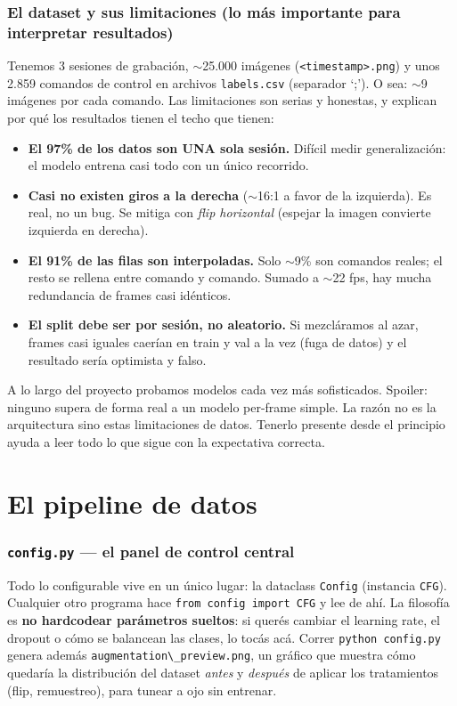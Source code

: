 \documentclass[11pt,a4paper]{article}
\newcommand{\code}[1]{\lstinline[basicstyle=\ttfamily\normalsize]|#1|}
\begin{document}
\section{El dataset y sus limitaciones (lo más importante para interpretar resultados)}
Tenemos 3 sesiones de grabación, $\sim$25.000 imágenes (\code{<timestamp>.png}) y unos 2.859 comandos de
control en archivos \code{labels.csv} (separador `;'). O sea: $\sim$9 imágenes por cada comando. Las
limitaciones son serias y honestas, y explican por qué los resultados tienen el techo que tienen:

\begin{itemize}
  \item \textbf{El 97\% de los datos son UNA sola sesión.} Difícil medir generalización: el modelo entrena
  casi todo con un único recorrido.
  \item \textbf{Casi no existen giros a la derecha} ($\sim$16:1 a favor de la izquierda). Es real, no un bug.
  Se mitiga con \emph{flip horizontal} (espejar la imagen convierte izquierda en derecha).
  \item \textbf{El 91\% de las filas son interpoladas.} Solo $\sim$9\% son comandos reales; el resto se
  rellena entre comando y comando. Sumado a $\sim$22 fps, hay mucha redundancia de frames casi idénticos.
  \item \textbf{El split debe ser por sesión, no aleatorio.} Si mezcláramos al azar, frames casi iguales
  caerían en train y val a la vez (fuga de datos) y el resultado sería optimista y falso.
\end{itemize}

\begin{ojo}
A lo largo del proyecto probamos modelos cada vez más sofisticados. Spoiler: ninguno supera de forma real
a un modelo per-frame simple. La razón no es la arquitectura sino estas limitaciones de datos. Tenerlo
presente desde el principio ayuda a leer todo lo que sigue con la expectativa correcta.
\end{ojo}

\part{El pipeline de datos}

\section{\texttt{config.py} --- el panel de control central}
Todo lo configurable vive en un único lugar: la dataclass \code{Config} (instancia \code{CFG}). Cualquier otro
programa hace \code{from config import CFG} y lee de ahí. La filosofía es \textbf{no hardcodear parámetros
sueltos}: si querés cambiar el learning rate, el dropout o cómo se balancean las clases, lo tocás acá.
Correr \code{python config.py} genera además \code{augmentation\_preview.png}, un gráfico que muestra cómo
quedaría la distribución del dataset \emph{antes} y \emph{después} de aplicar los tratamientos (flip,
remuestreo), para tunear a ojo sin entrenar.
\end{document}
